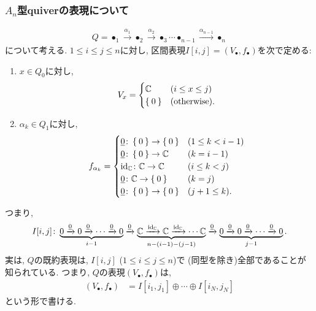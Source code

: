 \subsubsection{$A_n$型quiverの表現について}
\begin{align*}
Q=\bullet_1\xrightarrow{\alpha_1}\bullet_2\xrightarrow{\alpha_2}\bullet_3\cdots \bullet_{n-1}\xrightarrow{\alpha_{n-1}}\bullet_n
\end{align*}
について考える.
$1\leq i\leq j\leq n$に対し,
区間表現$I[i,j]=(V_\bullet,f_\bullet)$を次で定める:
\begin{enumerate}
\item
  $x\in Q_0$に対し,
  \begin{align*}
    V_x=
    \begin{cases}
      \mathbb{C} & (i\leq x \leq j)\\
      \Set{0} & (\text{otherwise}).
    \end{cases}
  \end{align*}
\item
  $\alpha_k\in Q_1$に対し,
  \begin{align*}
    f_{\alpha_k}=
    \begin{cases}
      \underline{0}\colon\Set{0} \to \Set{0} & (1\leq k < i-1)\\
      \underline{0}\colon\Set{0} \to \mathbb{C} & (k=i-1)\\
      \operatorname{id}_{\mathbb{C}}\colon\mathbb{C} \to \mathbb{C} & (i\leq k < j)\\
      \underline{0}\colon\mathbb{C} \to \Set{0} & (k=j)\\
      \underline{0}\colon\Set{0} \to \Set{0} & (j+1\leq k).
    \end{cases}
  \end{align*}  
\end{enumerate}
つまり,
\begin{align*}
  I[i,j]\colon
  \underbrace{0\xrightarrow{\underline{0}}
  0\xrightarrow{\underline{0}} \cdots \xrightarrow{\underline{0}}
  0}_{i-1}\xrightarrow{\underline{0}}
  \underbrace{\mathbb{C} \xrightarrow{\operatorname{id}_{\mathbb{C}}}
  \mathbb{C} \xrightarrow{\operatorname{id}_{\mathbb{C}}} \cdots\mathbb{C}}_{n-(i-1)-(j-1)} \xrightarrow{\underline{0}}
  \underbrace{0\xrightarrow{\underline{0}}
  0\xrightarrow{\underline{0}} \cdots \xrightarrow{\underline{0}}
  0}_{j-1}.
\end{align*}
実は,
$Q$の既約表現は, $I[i,j]$ ($1\leq i\leq j \leq n$)で
(同型を除き)全部であることが知られている.
つまり, $Q$の表現$(V_\bullet,f_\bullet)$は,
\begin{align*}
  (V_\bullet,f_\bullet)
  &=I[i_1,j_1]\oplus\cdots\oplus I[i_N,j_N]
\end{align*}
という形で書ける.

